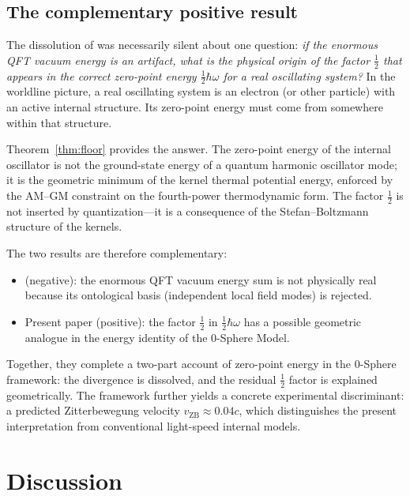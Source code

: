 \documentclass[%
 reprint, amsmath,amssymb, aps, prb, ]{revtex4-2}
\numberwithin{equation}{section}
\begin{document}
\subsection{The complementary positive result}

The dissolution of \cite{hanamura2026_32} was necessarily silent about one question: \emph{if the enormous QFT vacuum energy is an artifact, what is the physical origin of the factor $\tfrac{1}{2}$ that appears in the correct zero-point energy $\tfrac{1}{2}\hbar\omega$ for a real oscillating system?} In the worldline picture, a real oscillating system is an electron (or other particle) with an active internal structure. Its zero-point energy must come from somewhere within that structure.

Theorem~\ref{thm:floor} provides the answer. The zero-point energy of the internal oscillator is not the ground-state energy of a quantum harmonic oscillator mode; it is the geometric minimum of the kernel thermal potential energy, enforced by the AM--GM constraint on the fourth-power thermodynamic form. The factor $\tfrac{1}{2}$ is not inserted by quantization---it is a consequence of the Stefan--Boltzmann structure of the kernels.

The two results are therefore complementary:
\begin{itemize}[noitemsep]
\item \cite{hanamura2026_32} (negative): the enormous QFT vacuum energy sum is not physically real because its ontological basis (independent local field modes) is rejected.
\item Present paper (positive): the factor $\tfrac{1}{2}$ in $\tfrac{1}{2}\hbar\omega$ has a possible geometric analogue in the energy identity of the 0-Sphere Model.
\end{itemize}
Together, they complete a two-part account of zero-point energy in the 0-Sphere framework: the divergence is dissolved, and the residual $\tfrac{1}{2}$ factor is explained geometrically. The framework further yields a concrete experimental discriminant: a predicted Zitterbewegung velocity $v_{\mathrm{ZB}} \approx 0.04c$, which distinguishes the present interpretation from conventional light-speed internal models.

\section{Discussion}
\label{sec:discussion}
\end{document}
